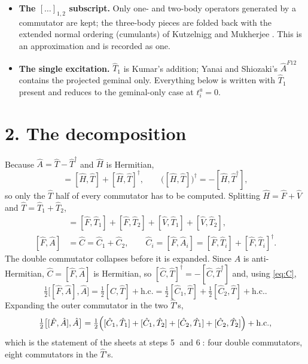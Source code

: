 \documentclass[11pt]{article}
\newcommand{\hc}{\mathrm{h.c.}}
\begin{document}
\begin{itemize}
  \item \textbf{The $[\dots]_{1,2}$ subscript.} Only one- and two-body
        operators generated by a commutator are kept; the three-body pieces are
        folded back with the extended normal ordering (cumulants) of
        Kutzelnigg and Mukherjee \cite{Kutzelnigg:1997}. This is an
        approximation and is recorded as one.
  \item \textbf{The single excitation.} $\hat T_1$ is Kumar's addition;
        Yanai and Shiozaki's $\hat A^{F12}$ contains the projected geminal
        only. Everything below is written with $\hat T_1$ present and reduces
        to the geminal-only case at $t^a_i=0$.
\end{itemize}

\section*{2. The decomposition}

Because $\hat A=\hat T-\hat T^\dagger$ and $\hat H$ is Hermitian,
\begin{equation}
  [\hat H,\hat A]=[\hat H,\hat T]+[\hat H,\hat T]^\dagger,
  \qquad
  \bigl([\hat H,\hat T]\bigr)^\dagger=-[\hat H,\hat T^\dagger],
  \label{eq:hc}
\end{equation}
so only the $\hat T$ half of every commutator has to be computed. Splitting
$\hat H=\hat F+\hat V$ and $\hat T=\hat T_1+\hat T_2$,
\begin{align}
  [\hat H,\hat T]&=[\hat F,\hat T_1]+[\hat F,\hat T_2]
                  +[\hat V,\hat T_1]+[\hat V,\hat T_2],
   \label{eq:first}\\[2pt]
  [\hat F,\hat A]&=\hat C=\hat C_1+\hat C_2,
   \qquad
  \hat C_i=[\hat F,\hat A_i]=[\hat F,\hat T_i]+[\hat F,\hat T_i]^\dagger .
   \label{eq:C}
\end{align}
The double commutator collapses before it is expanded. Since $\hat A$ is
anti-Hermitian, $\hat C=[\hat F,\hat A]$ is Hermitian, so
$[\hat C,\hat T]^\dagger=-[\hat C,\hat T^\dagger]$ and, using \eqref{eq:C},
\begin{equation}
  \tfrac12\bigl[[\hat F,\hat A],\hat A\bigr]
   =\tfrac12[\hat C,\hat T]+\hc
   =\tfrac12[\hat C_1,\hat T]+\tfrac12[\hat C_2,\hat T]+\hc .
  \label{eq:double}
\end{equation}
Expanding the outer commutator in the two $\hat T$'s,
\begin{equation}
  \tfrac12\bigl[[\hat F,\hat A],\hat A\bigr]
   =\tfrac12\Bigl(
      [\hat C_1,\hat T_1]+[\hat C_1,\hat T_2]
     +[\hat C_2,\hat T_1]+[\hat C_2,\hat T_2]\Bigr)+\hc,
   \label{eq:doubleexpanded}
\end{equation}
which is the statement of the sheets at steps \textcircled{5} and
\textcircled{6}: four double commutators, eight commutators in the $\hat T$'s.
\end{document}
